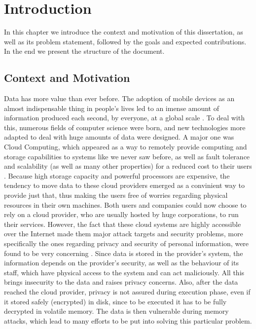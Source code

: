 \newcommand{\novathesis}{\emph{novathesis}}
\newcommand{\novathesisclass}{\texttt{novathesis.cls}}


\chapter{Introduction}
\label{cha:introduction}

In this chapter we introduce the context and motivation of this dissertation, as well as its problem statement, followed by the goals and expected contributions. In the end we present the structure of the document.




\section{Context and Motivation}
Data has more value than ever before. 
The adoption of mobile devices as an almost indispensable thing in people's lives led to an imense amount of information produced each second, by everyone, at a global scale \cite{dataAnalysis1}\cite{dataAnalysis2}.
To deal with this, numerous fields of computer science were born, and new technologies more adapted to deal with huge amounts of data were designed. 
A major one was Cloud Computing, which appeared as a way to remotely provide computing and storage capabilities to systems like we never saw before, as well as fault tolerance and scalability (as well as many other properties) for a reduced cost to their users \cite{cloudOrigins}. 
Because high storage capacity and powerful processors are expensive, the tendency to move data to these cloud providers emerged as a convinient way to provide just that, thus making the users free of worries regarding physical resources in their own machines. Both users and companies could now choose to rely on a cloud provider, who are usually hosted by huge corporations, to run their services.
However, the fact that these cloud systems are highly accessible over the Internet made them major attack targets \cite{cloudAttacksReport} and security problems, more specifically the ones regarding privacy and security of personal information, were found to be very concerning \cite{playstationAttack}. 
Since data is stored in the provider's system, the information depends on the provider's security, as well as the behaviour of its staff, which have physical access to the system and can act maliciously. All this brings insecurity to the data and raises privacy concerns.
Also, after the data reached the cloud provider, privacy is not assured during execution phase, even if it stored safely (encrypted) in disk, since to be executed it has to be fully decrypted in volatile memory. The data is then vulnerable during memory attacks, which lead to many efforts to be put into solving this particular problem.  

